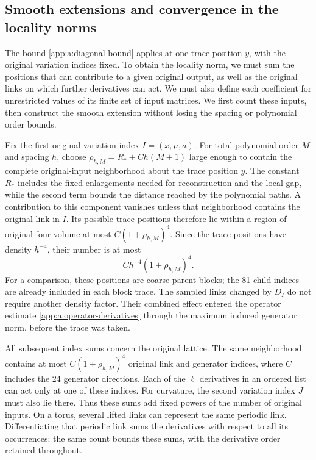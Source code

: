 \documentclass[11pt,a4paper]{article}
\theoremstyle{remark}
\begin{document}
\subsection{Smooth extensions and convergence in the locality norms}

The bound \eqref{app:a:diagonal-bound} applies at one trace position
$y$, with the original variation indices fixed. To obtain the locality
norm, we must sum the positions that can contribute to a given original
output, as well as the original links on which further derivatives can
act. We must also define each coefficient for unrestricted values of
its finite set of input matrices. We first count these inputs, then
construct the smooth extension without losing the spacing or polynomial
order bounds.

Fix the first original variation index $I=(x,\mu,a)$. For total
polynomial order $M$ and spacing $h$, choose
$\rho_{h,M}=R_*+Ch(M+1)$ large enough to contain the complete
original-input neighborhood about the trace position $y$. The constant
$R_*$ includes the fixed enlargements needed for reconstruction and
the local gap, while the second term bounds the distance reached by the
polynomial paths. A contribution to this component vanishes unless
that neighborhood contains the original link in $I$. Its possible trace
positions therefore lie within a region of original four-volume at
most $C(1+\rho_{h,M})^4$. Since the trace positions have density
$h^{-4}$, their number is at most
\begin{equation}
 C h^{-4}(1+\rho_{h,M})^4.
 \label{app:a:density}
\end{equation}
For a comparison, these positions are coarse parent blocks; the 81 child
indices are already included in each block trace. The sampled links
changed by $D_I$ do not require another density factor. Their combined
effect entered the operator estimate
\eqref{app:a:operator-derivatives} through the maximum induced
generator norm, before the trace was taken.

All subsequent index sums concern the original lattice. The same
neighborhood contains at most $C(1+\rho_{h,M})^4$ original link
and generator indices, where $C$ includes the 24 generator directions.
Each of the $\ell$ derivatives in an ordered list can act only at one
of these indices. For curvature, the second variation index $J$ must
also lie there. Thus these sums add fixed powers of the number of
original inputs. On a torus, several lifted links can represent the same
periodic link. Differentiating that periodic link sums the derivatives
with respect to all its occurrences; the same count bounds these
sums, with the derivative order retained throughout.
\end{document}
